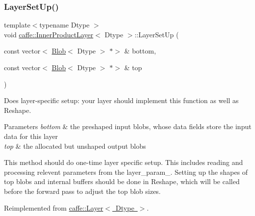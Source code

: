 \subsubsection{\texorpdfstring{Layer\+Set\+Up()}{LayerSetUp()}\hspace{0.1cm}{\footnotesize\ttfamily [1/2]}}
{\footnotesize\ttfamily template$<$typename Dtype $>$ \\
void \mbox{\hyperlink{classcaffe_1_1_inner_product_layer}{caffe\+::\+Inner\+Product\+Layer}}$<$ Dtype $>$\+::Layer\+Set\+Up (\begin{DoxyParamCaption}\item[{const vector$<$ \mbox{\hyperlink{classcaffe_1_1_blob}{Blob}}$<$ Dtype $>$ $\ast$$>$ \&}]{bottom,  }\item[{const vector$<$ \mbox{\hyperlink{classcaffe_1_1_blob}{Blob}}$<$ Dtype $>$ $\ast$$>$ \&}]{top }\end{DoxyParamCaption})\hspace{0.3cm}{\ttfamily [virtual]}}



Does layer-\/specific setup\+: your layer should implement this function as well as Reshape. 


\begin{DoxyParams}{Parameters}
{\em bottom} & the preshaped input blobs, whose data fields store the input data for this layer \\
\hline
{\em top} & the allocated but unshaped output blobs\\
\hline
\end{DoxyParams}
This method should do one-\/time layer specific setup. This includes reading and processing relevent parameters from the {\ttfamily layer\+\_\+param\+\_\+}. Setting up the shapes of top blobs and internal buffers should be done in {\ttfamily Reshape}, which will be called before the forward pass to adjust the top blob sizes. 

Reimplemented from \mbox{\hyperlink{classcaffe_1_1_layer_a481323a3e0972c682787f2137468c29f}{caffe\+::\+Layer$<$ Dtype $>$}}.

\mbox{\label{classcaffe_1_1_inner_product_layer_a35643c908323b6341101db342e4e78ee}} 
